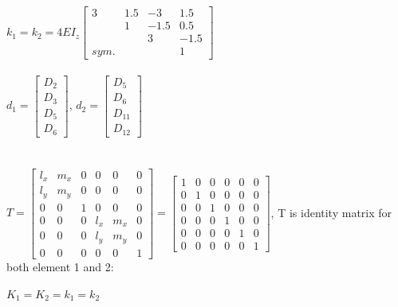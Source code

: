 \documentclass{article}
\begin{document}
$k_1=k_2=4EI_z\begin{bmatrix}
    3 & 1.5 & -3 & 1.5 \\
    & 1 & -1.5 & 0.5 \\
    & & 3 & -1.5 \\
    sym. & & & 1
\end{bmatrix}$ \\\\
$d_1=\begin{bmatrix}
    D_2 \\ D_3 \\ D_5 \\ D_6
\end{bmatrix}$, \quad
$d_2=\begin{bmatrix}
    D_5 \\ D_6 \\ D_{11} \\ D_{12}
\end{bmatrix}$ \\\\\\
$T=\begin{bmatrix}
    l_x & m_x & 0 & 0 & 0 & 0 \\
    l_y & m_y & 0 & 0 & 0 & 0 \\
    0 & 0 & 1 & 0 & 0 & 0 \\
    0 & 0 & 0 & l_x & m_x & 0 \\
    0 & 0 & 0 & l_y & m_y & 0 \\
    0 & 0 & 0 & 0 & 0 & 1
\end{bmatrix}=\begin{bmatrix}
    1 & 0 & 0 & 0 & 0 & 0 \\
    0 & 1 & 0 & 0 & 0 & 0 \\
    0 & 0 & 1 & 0 & 0 & 0 \\
    0 & 0 & 0 & 1 & 0 & 0 \\
    0 & 0 & 0 & 0 & 1 & 0 \\
    0 & 0 & 0 & 0 & 0 & 1
\end{bmatrix}$, T is identity matrix for both element 1 and 2: \\\\
$K_1=K_2=k_1=k_2$
\end{document}
